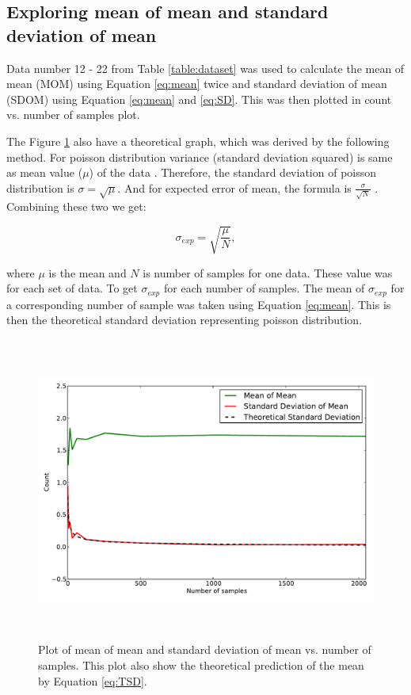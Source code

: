 \documentclass[a4paper,12pt]{article}
\begin{document}
\subsection{Exploring mean of mean and standard deviation of mean}
\label{sec:MOM_SDOM}

Data number 12 - 22 from Table \ref{table:dataset} was used to calculate the mean of mean (MOM) using Equation \ref{eq:mean} twice and standard deviation of mean (SDOM) using Equation \ref{eq:mean} and  \ref{eq:SD}. This was then plotted in count vs. number of samples plot. 

The Figure \ref{fig:task9} also have a theoretical graph, which was derived by the following method. For poisson distribution variance (standard deviation squared) is same as mean value ($\mu$) of the data \citep{Stat}. Therefore, the standard deviation of poisson distribution is $\sigma = \sqrt{\mu}$. And for expected error of mean, the formula is $\frac{\sigma}{\sqrt{N}} $ \citep{error}. Combining these two we get:

\begin{equation}
\label{eq:TSD}
\sigma_{exp} = \sqrt{\frac{\mu}{N}},
\end{equation}

where $\mu$ is the mean and $N$ is number of samples for one data. These value was for each set of data. To get $\sigma_{exp}$ for each number of samples. The mean of $\sigma_{exp}$ for a corresponding number of sample was taken using Equation \ref{eq:mean}. This is then the theoretical standard deviation representing poisson distribution. 

\begin{figure}[H]
\centering
\includegraphics[angle=0,height=10cm,width=15.5cm]{graphs/task9.pdf}
\caption{Plot of mean of mean and standard deviation of mean vs. number of samples. This plot also show the theoretical prediction of the mean by Equation \ref {eq:TSD}.}
\label{fig:task9}
\end{figure}
\end{document}
